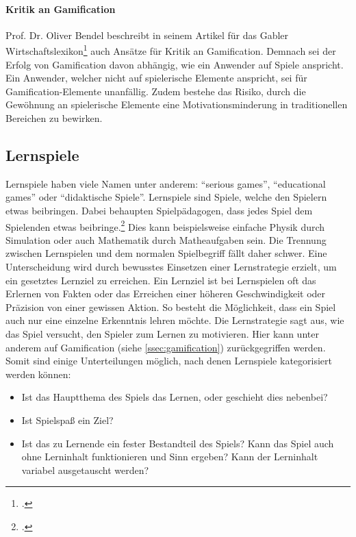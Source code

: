     \paragraph{Kritik an Gamification}
    Prof. Dr. Oliver Bendel beschreibt in seinem Artikel für das Gabler Wirtschaftslexikon\footcite{gabler-gamification} auch Ansätze für Kritik an Gamification. Demnach sei der Erfolg von Gamification davon abhängig, wie ein Anwender auf Spiele anspricht. Ein Anwender, welcher nicht auf spielerische Elemente anspricht, sei für Gamification-Elemente unanfällig. Zudem bestehe das Risiko, durch die Gewöhnung an spielerische Elemente eine Motivationsminderung in traditionellen Bereichen zu bewirken.

\subsection{Lernspiele}
	Lernspiele haben viele Namen unter anderem: \enquote{serious games}, \enquote{educational games} oder \enquote{didaktische Spiele}.
	Lernspiele sind Spiele, welche den Spielern etwas beibringen. Dabei behaupten Spielpädagogen, dass jedes Spiel dem Spielenden etwas beibringe.\footcite{lernspiel} Dies kann beispielsweise einfache Physik durch Simulation oder auch Mathematik durch Matheaufgaben sein. Die Trennung zwischen Lernspielen und dem normalen Spielbegriff fällt daher schwer. Eine Unterscheidung wird durch bewusstes Einsetzen einer Lernstrategie erzielt, um ein gesetztes Lernziel zu erreichen.
	Ein Lernziel ist bei Lernspielen oft das Erlernen von Fakten oder das Erreichen einer höheren Geschwindigkeit oder Präzision von einer gewissen Aktion. So besteht die Möglichkeit, dass ein Spiel auch nur eine einzelne Erkenntnis lehren möchte.
	Die Lernstrategie sagt aus, wie das Spiel versucht, den Spieler zum Lernen zu motivieren. Hier kann unter anderem auf Gamification (siehe \ref{ssec:gamification}) zurückgegriffen werden.
	Somit sind einige Unterteilungen möglich, nach denen Lernspiele kategorisiert werden können:
	\begin{itemize}
		\item{ Ist das Hauptthema des Spiels das Lernen, oder geschieht dies nebenbei?}
		\item{ Ist Spielspaß ein Ziel? }
		\item{ Ist das zu Lernende ein fester Bestandteil des Spiels? Kann das Spiel auch ohne Lerninhalt funktionieren und Sinn ergeben? Kann der Lerninhalt variabel ausgetauscht werden? }
	\end{itemize}
